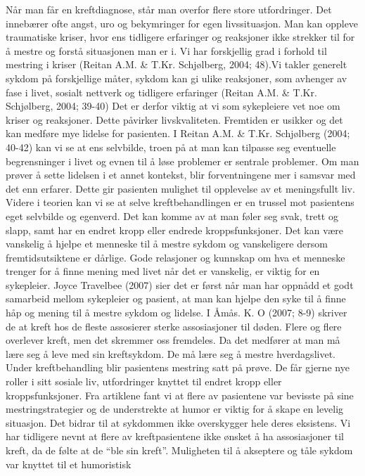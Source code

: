 Når man får en kreftdiagnose, står man overfor flere store utfordringer. Det
innebærer ofte angst, uro og bekymringer for egen livssituasjon. Man kan
oppleve traumatiske kriser, hvor ens tidligere erfaringer og reaksjoner ikke
strekker til for å mestre og forstå situasjonen man er i. Vi har forskjellig
grad i forhold til mestring i kriser (Reitan A.M. \&{} T.Kr. Schjølberg, 2004;
48).Vi takler generelt sykdom på forskjellige måter, sykdom kan gi ulike
reaksjoner, som avhenger av fase i livet, sosialt nettverk og tidligere
erfaringer (Reitan A.M. \&{} T.Kr. Schjølberg, 2004; 39-40) Det er derfor viktig
at vi som sykepleiere vet noe om kriser og reaksjoner. Dette påvirker
livskvaliteten. Fremtiden er usikker og det kan medføre mye lidelse for
pasienten. I Reitan A.M. \&{} T.Kr. Schjølberg (2004; 40-42) kan vi se at ens
selvbilde, troen på at man kan tilpasse seg eventuelle begrensninger i livet og
evnen til å løse problemer er sentrale problemer. Om man prøver å sette
lidelsen i et annet kontekst, blir forventningene mer i samsvar med det enn
erfarer. Dette gir pasienten mulighet til opplevelse av et meningsfullt liv.
Videre i teorien kan vi se at selve kreftbehandlingen er en trussel mot
pasientens eget selvbilde og egenverd. Det kan komme av at man føler seg svak,
trett og slapp, samt har en endret kropp eller endrede kroppsfunksjoner. Det
kan være vanskelig å hjelpe et menneske til å mestre sykdom og vanskeligere
dersom fremtidsutsiktene er dårlige. Gode relasjoner og kunnskap om hva et
menneske trenger for å finne mening med livet når det er vanskelig, er viktig
for en sykepleier. Joyce Travelbee (2007) sier det er først når man har oppnådd
et godt samarbeid mellom sykepleier og pasient, at man kan hjelpe den syke til
å finne håp og mening til å mestre sykdom og lidelse.  I Åmås. K. O (2007; 8-9)
skriver de at kreft hos de fleste assosierer sterke assosiasjoner til døden.
Flere og flere overlever kreft, men det skremmer oss fremdeles. Da det medfører
at man må lære seg å leve med sin kreftsykdom. De må lære seg å mestre
hverdagslivet. Under kreftbehandling blir pasientens mestring satt på prøve. De
får gjerne nye roller i sitt sosiale liv, utfordringer knyttet til endret kropp
eller kroppsfunksjoner. Fra artiklene fant vi at flere av pasientene var
bevisste på sine mestringstrategier og de understrekte at humor er viktig for å
skape en levelig situasjon. Det bidrar til at sykdommen ikke overskygger hele
deres eksistens.  Vi har tidligere nevnt at flere av kreftpasientene ikke
ønsket å ha assosiasjoner til kreft, da de følte at de “ble sin kreft”.
Muligheten til å akseptere og tåle sykdom var knyttet til et humoristisk
